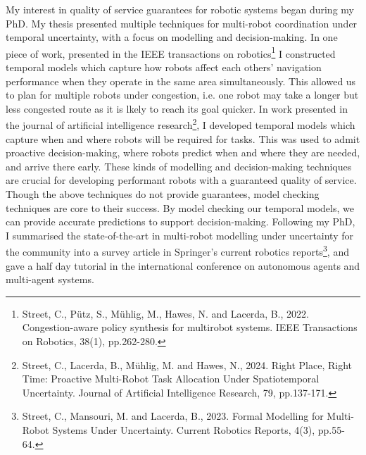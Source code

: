 \documentclass[11pt]{article}
\begin{document}
My interest in quality of service guarantees for robotic systems began during my PhD.
%
My thesis presented multiple techniques for multi-robot coordination under temporal uncertainty, with a focus on modelling and decision-making.
%
In one piece of work, presented in the IEEE transactions on robotics\footnote{Street, C., Pütz, S., Mühlig, M., Hawes, N. and Lacerda, B., 2022. Congestion-aware policy synthesis for multirobot systems. IEEE Transactions on Robotics, 38(1), pp.262-280.} I constructed temporal models which capture how robots affect each others' navigation performance when they operate in the same area simultaneously.
%
This allowed us to plan for multiple robots under congestion, i.e. one robot may take a longer but less congested route as it is lkely to reach its goal quicker.
%
In work presented in the journal of artificial intelligence research\footnote{Street, C., Lacerda, B., Mühlig, M. and Hawes, N., 2024. Right Place, Right Time: Proactive Multi-Robot Task Allocation Under Spatiotemporal Uncertainty. Journal of Artificial Intelligence Research, 79, pp.137-171.}, I developed temporal models which capture when and where robots will be required for tasks.
%
This was used to admit proactive decision-making, where robots predict when and where they are needed, and arrive there early.
%
These kinds of modelling and decision-making techniques are crucial for developing performant robots with a guaranteed quality of service.
%
Though the above techniques do not provide guarantees, model checking techniques are core to their success.
%
By model checking our temporal models, we can provide accurate predictions to support decision-making.
%
Following my PhD, I summarised the state-of-the-art in multi-robot modelling under uncertainty for the community into a survey article in Springer's current robotics reports\footnote{Street, C., Mansouri, M. and Lacerda, B., 2023. Formal Modelling for Multi-Robot Systems Under Uncertainty. Current Robotics Reports, 4(3), pp.55-64.}, and gave a half day tutorial in the international conference on autonomous agents and multi-agent systems.





\end{document}
